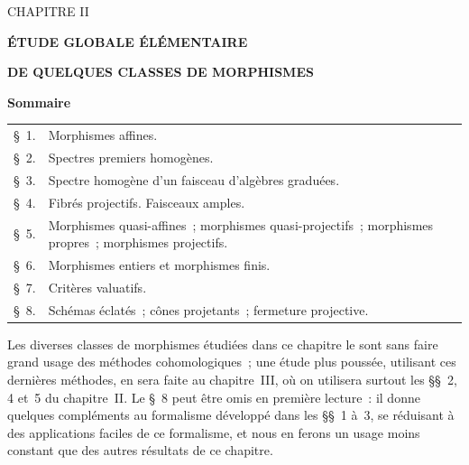 \clearpage
\thispagestyle{plain}
\label{chapter:II-fr}

\begin{center}
{\large CHAPITRE II\par}
\vspace{1.5em}
{\Large\bfseries ÉTUDE GLOBALE ÉLÉMENTAIRE\par}
{\Large\bfseries DE QUELQUES CLASSES DE MORPHISMES\par}
\vspace{1.8em}
{\bfseries Sommaire\par}
\end{center}

\medskip
\begin{tabular}{@{}r@{\ }p{}@{}}
\S~1. & Morphismes affines.\\
\S~2. & Spectres premiers homogènes.\\
\S~3. & Spectre homogène d'un faisceau d'algèbres graduées.\\
\S~4. & Fibrés projectifs. Faisceaux amples.\\
\S~5. & Morphismes quasi-affines~; morphismes quasi-projectifs~; morphismes
         propres~; morphismes projectifs.\\
\S~6. & Morphismes entiers et morphismes finis.\\
\S~7. & Critères valuatifs.\\
\S~8. & Schémas éclatés~; cônes projetants~; fermeture projective.
\end{tabular}

\medskip
Les diverses classes de morphismes étudiées dans ce chapitre le sont sans
faire grand usage des méthodes cohomologiques~; une étude plus poussée,
utilisant ces dernières méthodes, en sera faite au chapitre~III, où on
utilisera surtout les \S\S~2, 4 et~5 du chapitre~II. Le \S~8 peut être omis en
première lecture~: il donne quelques compléments au formalisme développé dans
les \S\S~1 à~3, se réduisant à des applications faciles de ce formalisme, et
nous en ferons un usage moins constant que des autres résultats de ce
chapitre.
